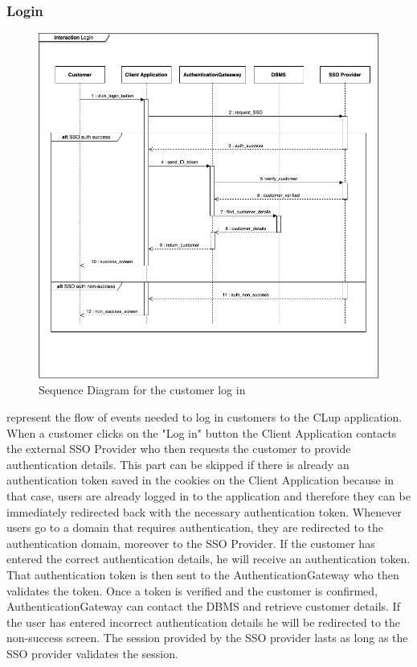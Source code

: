 \subsubsection{Login}
\begin{figure}[H]
    \centering
    \includegraphics[height=0.6\textwidth]{Images/SequenceDiagrams/Login.png}
    \caption{Sequence Diagram for the customer log in}
    \label{fig:SDLogin}
\end{figure}
 represent the flow of events needed to log in customers to the CLup application.
When a customer clicks on the "Log in" button the Client Application contacts the external SSO Provider who then requests the customer to provide authentication details.
This part can be skipped if there is already an authentication token saved in the cookies on the Client Application because in that case, users are already logged in to the application and therefore they can be immediately redirected back with the necessary authentication token.
Whenever users go to a domain that requires authentication, they are redirected to the authentication domain, moreover to the SSO Provider.
If the customer has entered the correct authentication details, he will receive an authentication token. That authentication token is then sent to the AuthenticationGateway who then validates the token.
Once a token is verified and the customer is confirmed, AuthenticationGateway can contact the DBMS and retrieve customer details.
If the user has entered incorrect authentication details he will be redirected to the non-success screen.
The session provided by the SSO provider lasts as long as the SSO provider validates the session.
